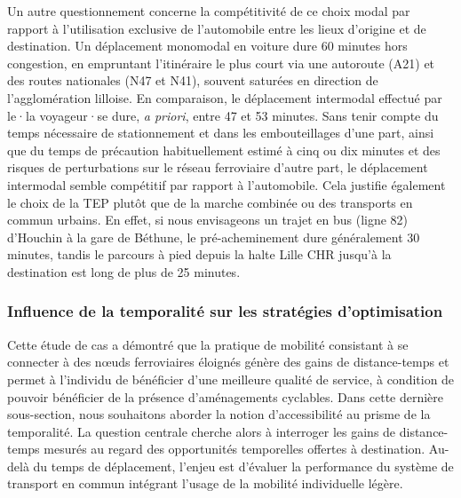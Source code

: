\begin{refsegment}
Un autre questionnement concerne la compétitivité de ce choix modal par rapport à l'utilisation exclusive de l'automobile entre les lieux d'origine et de destination. Un déplacement monomodal en voiture dure 60 minutes hors congestion, en empruntant l'itinéraire le plus court via une autoroute (A21) et des routes nationales (N47 et N41), souvent saturées en direction de l'agglomération lilloise. En comparaison, le déplacement intermodal effectué par le·la voyageur·se dure, \textsl{a priori}, entre 47 et 53 minutes. Sans tenir compte du temps nécessaire de stationnement et dans les embouteillages d'une part, ainsi que du temps de précaution habituellement estimé à cinq ou dix minutes et des risques de perturbations sur le réseau ferroviaire d'autre part, le déplacement intermodal semble  compétitif par rapport à l'automobile. Cela justifie également le choix de la \acrshort{TEP} plutôt que de la marche combinée ou des transports en commun urbains. En effet, si nous envisageons un trajet en bus (ligne 82) d'Houchin à la gare de Béthune, le pré-acheminement dure généralement 30 minutes, tandis le parcours à pied depuis la halte Lille CHR jusqu'à la destination est long de plus de 25 minutes.%

\subsubsection*{Influence de la temporalité sur les stratégies d'optimisation
    \label{chap5:temporalite}
    }

Cette étude de cas a démontré que la pratique de mobilité consistant à se connecter à des nœuds ferroviaires éloignés génère des gains de distance-temps et permet à l'individu de bénéficier d'une meilleure qualité de service, à condition de pouvoir bénéficier de la présence d'aménagements cyclables. Dans cette dernière sous-section, nous souhaitons aborder la notion d'accessibilité au prisme de la temporalité. La question centrale cherche alors à interroger les gains de distance-temps mesurés au regard des opportunités temporelles offertes à destination. Au-delà du temps de déplacement, l'enjeu est d'évaluer la performance du système de transport en commun intégrant l'usage de la mobilité individuelle légère.%
    

\end{refsegment}
